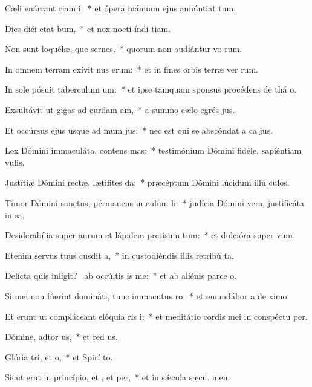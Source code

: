 \item Cæli enárrant riam i:~* et ópera mánuum ejus annúntiat tum.
\item Dies diéi etat bum,~* et nox nocti índi tiam.
\item Non sunt loquélæ, que sernes,~* quorum non audiántur vo rum.
\item In omnem terram exívit nus erum:~* et in fines orbis terræ ver rum.
\item In sole pósuit taberculum um:~* et ipse tamquam sponsus procédens de thá o.
\item Exsultávit ut gigas ad curdam am,~* a summo cælo egrés jus.
\item Et occúrsus ejus usque ad mum jus:~* nec est qui se abscóndat a ca jus.
\item Lex Dómini immaculáta, contens mas:~* testimónium Dómini fidéle, sapiéntiam  vulis.
\item Justítiæ Dómini rectæ, lætifites da:~* præcéptum Dómini lúcidum illú culos.
\item Timor Dómini sanctus, pérmanens in culum li:~* judícia Dómini vera, justificáta in sa.
\item Desiderabília super aurum et lápidem pretisum tum:~* et dulcióra super   vum.
\item Etenim servus tuus cusdit a,~* in custodiéndis illis retribú ta.
\item Delícta quis inligit?~\pscross{} ab occúltis is  me:~* et ab aliénis parce  o.
\item Si mei non fúerint domináti, tunc immacutus ro:~* et emundábor a de ximo.
\item Et erunt ut compláceant elóquia ris i:~* et meditátio cordis mei in conspéctu  per.
\item Dómine, adtor us,~* et red us.
\item Glória tri, et o,~* et Spirí to.
\item Sicut erat in princípio, et , et per,~* et in sǽcula sæcu. men.
